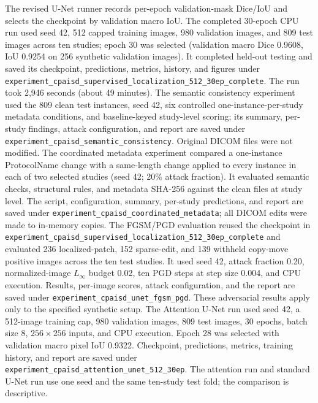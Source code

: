 \documentclass[journal]{IEEEtran}
\begin{document}
  The revised U-Net runner records per-epoch validation-mask Dice/IoU and selects the checkpoint by validation macro IoU. The completed 30-epoch CPU run used seed 42, 512 capped training images, 980 validation images, and 809 test images across ten studies; epoch 30 was selected (validation macro Dice 0.9608, IoU 0.9254 on 256 synthetic validation images). It completed held-out testing and saved its checkpoint, predictions, metrics, history, and figures under \texttt{experiment\_cpaisd\_supervised\_localization\_512\_30ep\_complete}. The run took 2,946 seconds (about 49 minutes).
  The semantic consistency experiment used the 809 clean test instances, seed 42, six controlled one-instance-per-study metadata conditions, and baseline-keyed study-level scoring; its summary, per-study findings, attack configuration, and report are saved under \texttt{experiment\_cpaisd\_semantic\_consistency}. Original DICOM files were not modified.
  The coordinated metadata experiment compared a one-instance ProtocolName change with a same-length change applied to every instance in each of two selected studies (seed 42; 20\% attack fraction). It evaluated semantic checks, structural rules, and metadata SHA-256 against the clean files at study level. The script, configuration, summary, per-study predictions, and report are saved under \texttt{experiment\_cpaisd\_coordinated\_metadata}; all DICOM edits were made to in-memory copies.
  The FGSM/PGD evaluation reused the checkpoint in \texttt{experiment\_cpaisd\_supervised\_localization\_512\_30ep\_complete} and evaluated 236 localized-patch, 152 sparse-edit, and 139 withheld copy-move positive images across the ten test studies. It used seed 42, attack fraction 0.20, normalized-image $L_\infty$ budget 0.02, ten PGD steps at step size 0.004, and CPU execution. Results, per-image scores, attack configuration, and the report are saved under \texttt{experiment\_cpaisd\_unet\_fgsm\_pgd}. These adversarial results apply only to the specified synthetic setup.
  The Attention U-Net run used seed 42, a 512-image training cap, 980 validation images, 809 test images, 30 epochs, batch size 8, $256\times256$ inputs, and CPU execution. Epoch 28 was selected with validation macro pixel IoU 0.9322. Checkpoint, predictions, metrics, training history, and report are saved under \texttt{experiment\_cpaisd\_attention\_unet\_512\_30ep}. The attention run and standard U-Net run use one seed and the same ten-study test fold; the comparison is descriptive.
\end{document}
